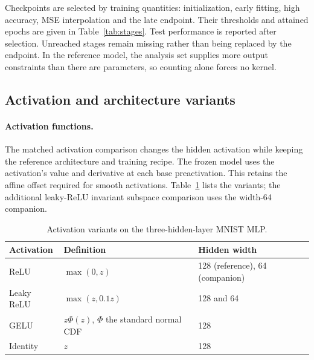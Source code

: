 Checkpoints are selected by training quantities: initialization, early fitting, high accuracy, MSE interpolation and the late endpoint. Their thresholds and attained epochs are given in Table~\ref{tab:stages}. Test performance is reported after selection. Unreached stages remain missing rather than being replaced by the endpoint. In the reference model, the analysis set supplies more output constraints than there are parameters, so counting alone forces no kernel.

\begin{table}[!htbp]
\caption{Training-defined stages of the three reference MNIST runs. Early fitting uses training error at most $10\%$, high accuracy uses the first saved checkpoint after error reaches $0.1\%$, and interpolation uses the first training MSE below $10^{-4}$. A unit is dead when inactive on all of $X$.}
\label{tab:stages}
\centering{}
\end{table}

\subsection{Activation and architecture variants}
\label{app:methods-activations}

\paragraph{Activation functions.}
The matched activation comparison changes the hidden activation while keeping the reference architecture and training recipe. The frozen model uses the activation's value and derivative at each base preactivation. This retains the affine offset required for smooth activations. Table~\ref{tab:early-method-activations} lists the variants; the additional leaky-ReLU invariant subspace comparison uses the width-64 companion.

\begin{table}[!htbp]\centering
\caption{Activation variants on the three-hidden-layer MNIST MLP.}\label{tab:early-method-activations}
\small\begin{tabular}{lll}\toprule
Activation & Definition & Hidden width\\\midrule
ReLU & $\max(0,z)$ & 128 (reference), 64 (companion)\\
Leaky ReLU & $\max(z,0.1z)$ & 128 and 64\\
GELU & $z\Phi(z)$, $\Phi$ the standard normal CDF & 128\\
Identity & $z$ & 128\\\bottomrule
\end{tabular}
\end{table}

